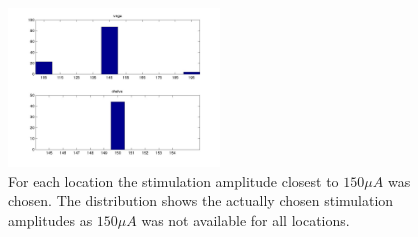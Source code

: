 \begin{figure}[ht]
	\centering
		\includegraphics[width=0.5\textwidth]{images/stim_amp_dist.jpg}
	\caption{
		For each location the stimulation amplitude closest to $150 \mu A$ was chosen. The distribution shows the actually chosen stimulation amplitudes as $150 \mu A$ was not available for all locations.}
	\label{sg:fig:stimamp_dist}
\end{figure}


